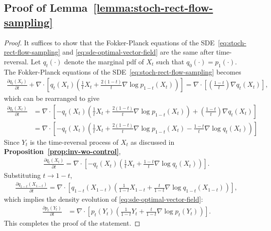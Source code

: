 \documentclass{article} %
\theoremstyle{plain}
\begin{document}
\subsection{Proof of Lemma~\ref{lemma:stoch-rect-flow-sampling}}
\label{sec:proofs-lemma-stoch-rect-flow-sampling}
\begin{proof}
It suffices to show that the Fokker-Planck equations of the SDE~\eqref{eq:stoch-rect-flow-sampling} and \eqref{eq:sde-optimal-vector-field} are the same after time-reversal. 
Let $q_t(\cdot)$ denote the marginal pdf of $X_t$ such that $q_0(\cdot) = p_1(\cdot)$.
The Fokker-Planck equations of the SDE~\eqref{eq:stoch-rect-flow-sampling} becomes
\begin{align*}
    \frac{\partial q_t(X_t)}{\partial t} + \nabla \cdot \left[q_t(X_t) \left(\frac{1}{t}X_t + \frac{2(1-t)}{t} \nabla \log p_{1-t}(X_t) \right) \right]
    = \nabla \cdot \left[\left(\frac{1-t}{t}\right) \nabla q_t(X_t)\right],
\end{align*}
which can be rearranged to give
\begin{align*}
    \frac{\partial q_t(X_t)}{\partial t} 
    &= \nabla \cdot \left[-q_t(X_t) \left(\frac{1}{t}X_t + \frac{2(1-t)}{t} \nabla \log p_{1-t}(X_t) \right)  
    +
    \left(\frac{1-t}{t}\right) \nabla q_t(X_t)\right]
    \\
    &= \nabla \cdot \left[-q_t(X_t) \left(\frac{1}{t}X_t + \frac{2(1-t)}{t} \nabla \log p_{1-t}(X_t)  
    -
    \frac{1-t}{t} \nabla \log q_t(X_t) \right)\right]
\end{align*}
Since $Y_t$ is the time-reversal process of $X_t$ as discussed in \textbf{Proposition~\eqref{prop:inv-wo-control}},
\begin{align*}
    \frac{\partial q_t(X_t)}{\partial t} 
    = \nabla \cdot \left[-q_t(X_t) \left(\frac{1}{t}X_t + \frac{1-t}{t} \nabla \log q_{t}(X_t) \right)\right].
\end{align*}
Substituting $t\rightarrow 1-t$, 
\begin{align*}
    \frac{\partial q_{1-t}(X_{1-t})}{\partial t} 
    = \nabla \cdot \left[q_{1-t}(X_{1-t}) \left(\frac{1}{1-t}X_{1-t} + \frac{t}{1-t} \nabla \log q_{1-t}(X_{1-t}) \right)\right],
\end{align*}
which implies the density evolution of \eqref{eq:sde-optimal-vector-field}:
\begin{align*}
    \frac{\partial p_{t}(Y_{t})}{\partial t} 
    & = \nabla \cdot \left[p_{t}(Y_{t}) \left(\frac{1}{1-t}Y_{t} + \frac{t}{1-t} \nabla \log p_{t}(Y_{t}) \right)\right].
\end{align*}
This completes the proof of the statement.
\end{proof}
\end{document}
